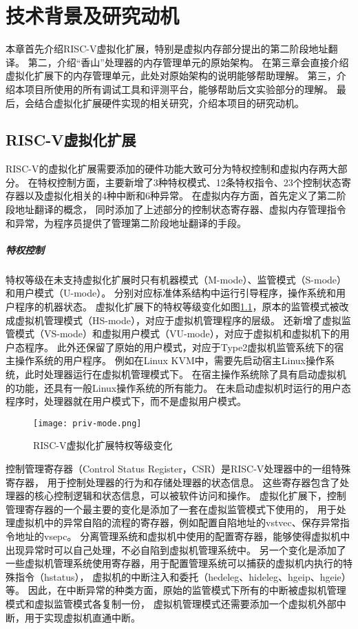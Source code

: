 \chapter{技术背景及研究动机}

本章首先介绍RISC-V虚拟化扩展，特别是虚拟内存部分提出的第二阶段地址翻译。
第二，介绍“香山”处理器的内存管理单元的原始架构。
在第三章会直接介绍虚拟化扩展下的内存管理单元，此处对原始架构的说明能够帮助理解。
第三，介绍本项目所使用的所有调试工具和评测平台，能够帮助后文实验部分的理解。
最后，会结合虚拟化扩展硬件实现的相关研究，介绍本项目的研究动机。

\section{RISC-V虚拟化扩展}
RISC-V的虚拟化扩展需要添加的硬件功能大致可分为特权控制和虚拟内存两大部分。
在特权控制方面，主要新增了3种特权模式、12条特权指令、23个控制状态寄存器以及虚拟化相关的4种中断和6种异常。
在虚拟内存方面，首先定义了第二阶段地址翻译的概念，
同时添加了上述部分的控制状态寄存器、虚拟内存管理指令和异常，为程序员提供了管理第二阶段地址翻译的手段。

\paragraph{特权控制}
特权等级在未支持虚拟化扩展时只有机器模式（M-mode）、监管模式（S-mode）和用户模式（U-mode）。
分别对应标准体系结构中运行引导程序，操作系统和用户程序的机器状态。
虚拟化扩展下的特权等级变化如图\ref*{fig:priv-mode}，原本的监管模式被改成虚拟机管理模式（HS-mode），对应于虚拟机管理程序的层级。
还新增了虚拟监管模式（VS-mode）和虚拟用户模式（VU-mode），对应于虚拟机和虚拟机下的用户态程序。
此外还保留了原始的用户模式，对应于Type2虚拟机监管系统下的宿主操作系统的用户程序。
例如在Linux KVM中，需要先启动宿主Linux操作系统，此时处理器运行在虚拟机管理模式下。
在宿主操作系统除了具有启动虚拟机的功能，还具有一般Linux操作系统的所有能力。
在未启动虚拟机时运行的用户态程序时，处理器就在用户模式下，而不是虚拟用户模式。

\begin{figure}[htbp]
    \centering
    \texttt{[image: priv-mode.png]}
    \caption{RISC-V虚拟化扩展特权等级变化}
    \label{fig:priv-mode}
\end{figure}

控制管理寄存器（Control Status Register，CSR）是RISC-V处理器中的一组特殊寄存器，
用于控制处理器的行为和存储处理器的状态信息。
这些寄存器包含了处理器的核心控制逻辑和状态信息，可以被软件访问和操作。
虚拟化扩展下，控制管理寄存器的一个最主要的变化是添加了一套在虚拟监管模式下使用的，
用于处理虚拟机中的异常自陷的流程的寄存器，例如配置自陷地址的vstvec、保存异常指令地址的vsepc。
分离管理系统和虚拟机中使用的配置寄存器，能够使得虚拟机中出现异常时可以自己处理，不必自陷到虚拟机管理系统中。
另一个变化是添加了一些虚拟机管理系统使用寄存器，用于配置管理系统可以捕获的虚拟机内执行的特殊指令（hstatus），
虚拟机的中断注入和委托（hedeleg、hideleg、hgeip、hgeie）等。
因此，在中断异常的种类方面，原始的监管模式下所有的中断被虚拟机管理模式和虚拟监管模式各复制一份，
虚拟机管理模式还需要添加一个虚拟机外部中断，用于实现虚拟机直通中断。

